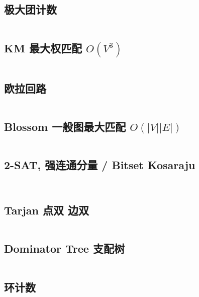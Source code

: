 \documentclass[titlepage, a4paper]{article}
\begin{document}
\begin{multicols}{2}
\begin{spacing}{0.6}
				\subsection{极大团计数}
					\inputminted{cpp}{src/TreeandGraph/CliqueCount.cpp}
				\subsection{KM 最大权匹配 $O(V^3)$}
					\inputminted{cpp}{src/TreeandGraph/KM.cpp}
				\subsection{欧拉回路}
				\inputminted{cpp}{src/TreeandGraph/欧拉回路.cpp}
				\subsection{Blossom 一般图最大匹配 $O(|V||E|)$}
				\inputminted{cpp}{src/TreeandGraph/Blossom_Tree.cpp}
				\subsection{2-SAT, 强连通分量 / Bitset Kosaraju}
					\inputminted{cpp}{src/TreeandGraph/2-sat.cpp}
					\inputminted{cpp}{src/TreeandGraph/kosaraju.cpp}
				\subsection{Tarjan 点双 边双}
					\inputminted{cpp}{src/TreeandGraph/Tarjan.cpp}
				\subsection{Dominator Tree 支配树}
					\inputminted{cpp}{src/TreeandGraph/支配树.cpp}
				\subsection{环计数}
					\inputminted{cpp}{src/TreeandGraph/环计数.cpp}

\end{spacing}
\end{multicols}
\end{document}
